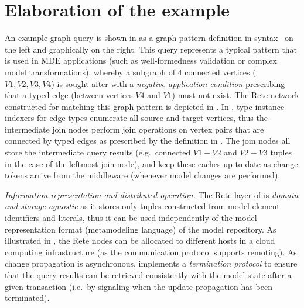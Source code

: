 \section{Elaboration of the example}
\label{sec:elaboration}

An example graph query is shown in  %
as a graph pattern definition in \eiq{} syntax~\cite{models10} on the left and graphically on the right. This query represents a typical pattern that is used in MDE applications (such as well-formedness validation or complex model transformations), whereby a subgraph of 4 connected vertices ($V1, V2, V3, V4$) is sought after with a \emph{negative application condition} prescribing that a typed edge (between vertices $V4$ and $V1$) must not exist.
The Rete network constructed for matching this graph pattern is depicted in . In \iqd{}, type-instance indexers for edge types enumerate all source and target vertices, thus the intermediate join nodes perform join operations on vertex pairs that are connected by typed edges as prescribed by the definition in . The join nodes all store the intermediate query results (e.g.\ connected $V1-V2$ and $V2-V3$ tuples in the case of the leftmost join node), and keep these caches up-to-date as change tokens arrive from the middleware (whenever model changes are performed).

\emph{Information representation and distributed operation.} The Rete layer of \iqd{} is \emph{domain and storage agnostic} as it stores only tuples constructed from model element identifiers and literals, thus it can be used independently of the model representation format (metamodeling language) of the model repository.
As illustrated in , the Rete nodes can be allocated to different hosts in a cloud computing infrastructure (as the communication protocol supports remoting). As change propagation is asynchronous, \iqd{} implements a \emph{termination protocol} to ensure that the query results can be retrieved consistently with the model state after a given transaction (i.e.\ by signaling when the update propagation has been terminated).

